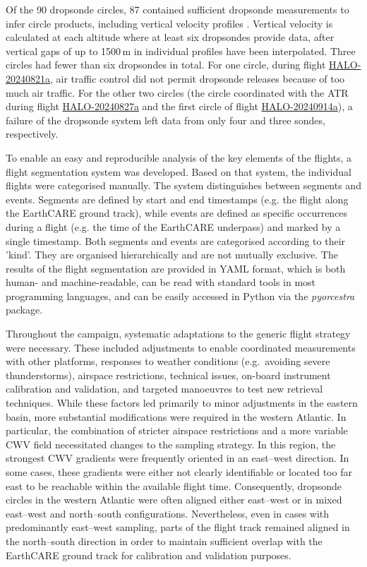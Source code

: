 \documentclass[acp, manuscript]{copernicus}
\begin{document}
Of the 90 dropsonde circles, 87 contained sufficient dropsonde measurements to infer circle products, including vertical velocity profiles \citep{gloecknerBEACHBarbadosEastern2026}.
Vertical velocity is calculated at each altitude where at least six dropsondes provide data, after vertical gaps of up to 1500\,\unit{m} in individual profiles have been interpolated.
Three circles had fewer than six dropsondes in total.
For one circle, during flight \href{https://orcestra-campaign.org/reports/HALO-20240821a.html}{HALO-20240821a}, air traffic control did not permit dropsonde releases because of too much air traffic.
For the other two circles (the circle coordinated with the ATR during flight \href{https://orcestra-campaign.org/reports/HALO-20240827a.html}{HALO-20240827a} and the first circle of flight \href{https://orcestra-campaign.org/reports/HALO-20240914a.html}{HALO-20240914a}), a failure of the dropsonde system left data from only four and three sondes, respectively.

To enable an easy and reproducible analysis of the key elements of the flights, a flight segmentation system was developed. Based on that system, the individual flights were categorised manually. The system distinguishes between segments and events. Segments are defined by start and end timestamps (e.g. the flight along the EarthCARE ground track), while events are defined as specific occurrences during a flight (e.g. the time of the EarthCARE underpass) and marked by a single timestamp. Both segments and events are categorised according to their 'kind'. They are organised hierarchically and are not mutually exclusive. The results of the flight segmentation are provided in YAML format, which is both human- and machine-readable, can be read with standard tools in most programming languages, and can be easily accessed in Python via the \textit{pyorcestra} package.

Throughout the campaign, systematic adaptations to the generic flight strategy were necessary. These included adjustments to enable coordinated measurements with other platforms, responses to weather conditions (e.g.~avoiding severe thunderstorms), airspace restrictions, technical issues, on-board instrument calibration and validation, and targeted manoeuvres to test new retrieval techniques. While these factors led primarily to minor adjustments in the eastern basin, more substantial modifications were required in the western Atlantic. In particular, the combination of stricter airspace restrictions and a more variable CWV field necessitated changes to the sampling strategy. In this region, the strongest CWV gradients were frequently oriented in an east--west direction. In some cases, these gradients were either not clearly identifiable or located too far east to be reachable within the available flight time. Consequently, dropsonde circles in the western Atlantic were often aligned either east--west or in mixed east--west and north--south configurations. Nevertheless, even in cases with predominantly east--west sampling, parts of the flight track remained aligned in the north--south direction in order to maintain sufficient overlap with the EarthCARE ground track for calibration and validation purposes.
\end{document}
